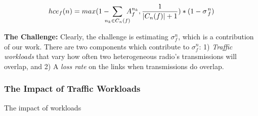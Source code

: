 \vspace{-0.1in}
\begin{equation}
\label{eq:hce}
 hce_f(n) = max(1 - \hspace{-0.12in} \sum\limits_{n_k \in C_n(f)} \hspace{-0.1in} A_f^{n_k}, \frac{
 1
 }{|C_n(f)| + 1})*(1-\sigma{\hspace{0.015in}_{f}^{n}})%
 \end{equation}

\textbf{The Challenge:} Clearly, the challenge is estimating $\sigma^n_f$, which is a contribution of our work.  There are two components which contribute to $\sigma^n_f$:  1) \emph{Traffic workloads} that vary how often two heterogeneous radio's transmissions will overlap, and 2) A \emph{loss rate} on the links when transmissions do overlap. 



\subsubsection{The Impact of Traffic Workloads}
\label{sec:workloads}

 The impact of workloads



